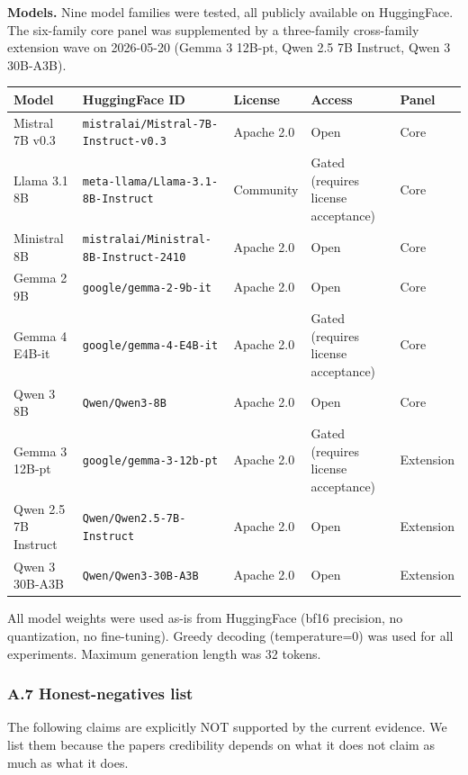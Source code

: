 \documentclass[
]{article}
\newcounter{none} %
\begin{document}
\textbf{Models.} Nine model families were tested, all publicly available
on HuggingFace. The six-family core panel was supplemented by a
three-family cross-family extension wave on 2026-05-20 (Gemma 3 12B-pt,
Qwen 2.5 7B Instruct, Qwen 3 30B-A3B).

{\def\LTcaptype{none} %
{\scriptsize\setlength{\tabcolsep}{2pt}\renewcommand{\arraystretch}{0.92} \begin{longtable}[]{@{}lllll@{}}
\toprule\noalign{}
Model & HuggingFace ID & License & Access & Panel \\
\midrule\noalign{}
\endhead
\bottomrule\noalign{}
\endlastfoot
Mistral 7B v0.3 & \texttt{mistralai/\allowbreak{}Mistral-7B-Instruct-v0.\allowbreak{}3} & Apache
2.0 & Open & Core \\
Llama 3.1 8B & \texttt{meta-llama/\allowbreak{}Llama-3.\allowbreak{}1-8B-Instruct} & Community &
Gated (requires license acceptance) & Core \\
Ministral 8B & \texttt{mistralai/\allowbreak{}Ministral-8B-Instruct-2410} & Apache
2.0 & Open & Core \\
Gemma 2 9B & \texttt{google/gemma-2-9b-it} & Apache 2.0 & Open & Core \\
Gemma 4 E4B-it & \texttt{google/gemma-4-E4B-it} & Apache 2.0 & Gated
(requires license acceptance) & Core \\
Qwen 3 8B & \texttt{Qwen/Qwen3-8B} & Apache 2.0 & Open & Core \\
Gemma 3 12B-pt & \texttt{google/gemma-3-12b-pt} & Apache 2.0 & Gated
(requires license acceptance) & Extension \\
Qwen 2.5 7B Instruct & \texttt{Qwen/Qwen2.5-7B-Instruct} & Apache 2.0 &
Open & Extension \\
Qwen 3 30B-A3B & \texttt{Qwen/Qwen3-30B-A3B} & Apache 2.0 & Open &
Extension \\
\end{longtable}}
}

All model weights were used as-is from HuggingFace (bf16 precision, no
quantization, no fine-tuning). Greedy decoding (temperature=0) was used
for all experiments. Maximum generation length was 32 tokens.

\subsubsection{A.7 Honest-negatives
list}\label{a7-honest-negatives-list}

The following claims are explicitly NOT supported by the current
evidence. We list them because the paper\textquotesingle s credibility
depends on what it does not claim as much as what it does.
\end{document}
